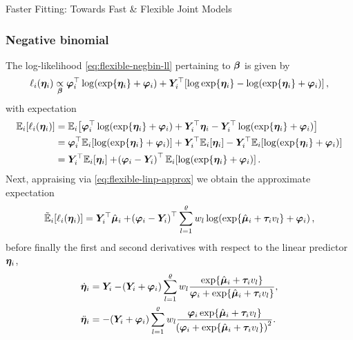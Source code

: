 \begin{chapter}{\label{cha:flexible}Faster Fitting: Towards Fast \& Flexible Joint Models}
\subsubsection{Negative binomial}
The log-likelihood \eqref{eq:flexible-negbin-ll} pertaining to $\bm{\beta}$ is given by
\begin{equation*}
    \ell_i\!\left(\bm{\eta}_i\right)\underset{\bm{\beta}}{\propto}\bm{\varphi}_i^\top\log\!\left(\exp\!\left\{\bm{\eta}_i\right\}+\bm{\varphi}_i\right)+\bm{Y}_i^\top\!\left[\log\exp\!\left\{\bm{\eta}_i\right\}-\log\!\left(\exp\!\left\{\bm{\eta}_i\right\}+\bm{\varphi}_i\right)\right],
\end{equation*}
with expectation
\begin{align*}
    \Expi{\elli{\linp}}&=\Expi{\bphi^\top\log\lb\exp\lbr\linp\rbr+\bphi\rb+\Y^\top\linp-\Y^\top\log\lb\exp\lbr\linp\rbr+\bphi\rb}\\
    &=\bphi^\top\Expi{\log\lb\exp\lbr\linp\rbr+\bphi\rb}+\Y^\top\Expi{\linp}-\Y^\top\Expi{\log\lb\exp\lbr\linp\rbr+\bphi\rb}\\
    &=\Y^\top\Expi{\linp}+\lb\bphi-\Y\rb^\top\Expi{\log\lb\exp\lbr\linp\rbr+\bphi\rb}.
\end{align*}
Next, appraising via \eqref{eq:flexible-linp-approx} we obtain the approximate expectation
\begin{equation*}
    \tilde{\mathbb{E}}_i\!\left[\ell_i\!\left(\bm{\eta}_i\right)\right]=\bm{Y}_i^\top\hat{\bm{\mu}}_i + \!\left(\bm{\varphi}_i-\bm{Y}_i\right)^\top\sum_{l=1}^\varrho w_l\log\!\left(\exp\!\left\{\hat{\bm{\mu}}_i+\bm{\tau}_i v_l\right\}+\bm{\varphi}_i\right),
\end{equation*}
before finally the first and second derivatives with respect to the linear predictor $\bm{\eta}_i$,
\begin{equation}
    \begin{aligned}
        \dot{\bm{\eta}}_i&=\bm{Y}_i-\!\left(\bm{Y}_i+\bm{\varphi}_i\right)\sum_{l=1}^\varrho w_l\frac{\exp\!\left\{\hat{\bm{\mu}}_i+\bm{\tau}_i v_l\right\}}{\bm{\varphi}_i + \exp\!\left\{\hat{\bm{\mu}}_i+\bm{\tau}_i v_l\right\}},\\
        \ddot{\bm{\eta}}_i&=-\!\left(\bm{Y}_i+\bm{\varphi}_i\right)\sum_{l=1}^\varrho w_l\frac{\bm{\varphi}_i\exp\!\left\{\hat{\bm{\mu}}_i+\bm{\tau}_i v_l\right\}}{\!\left(\bm{\varphi}_i+\exp\!\left\{\hat{\bm{\mu}}_i+\bm{\tau}_i v_l\right\}\right)^2}.
    \end{aligned}
\label{eq:flexible-Mstep-negbin}
\end{equation}

\end{chapter}

